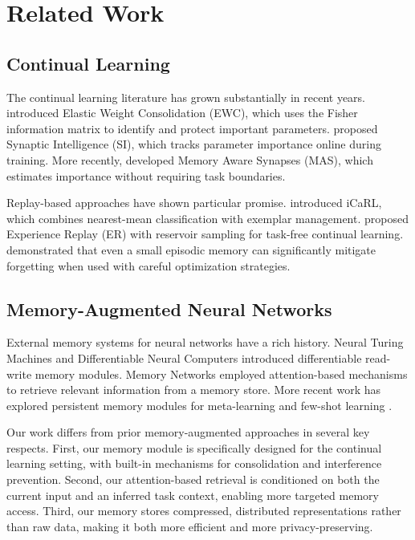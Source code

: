 \documentclass[11pt]{article}
\begin{document}
\section{Related Work}
\label{sec:related}

\subsection{Continual Learning}

The continual learning literature has grown substantially in recent years. \citet{kirkpatrick2017overcoming} introduced Elastic Weight Consolidation (EWC), which uses the Fisher information matrix to identify and protect important parameters. \citet{zenke2017continual} proposed Synaptic Intelligence (SI), which tracks parameter importance online during training. More recently, \citet{aljundi2018memory} developed Memory Aware Synapses (MAS), which estimates importance without requiring task boundaries.

Replay-based approaches have shown particular promise. \citet{rebuffi2017icarl} introduced iCaRL, which combines nearest-mean classification with exemplar management. \citet{rolnick2019experience} proposed Experience Replay (ER) with reservoir sampling for task-free continual learning. \citet{chaudhry2019tiny} demonstrated that even a small episodic memory can significantly mitigate forgetting when used with careful optimization strategies.

\subsection{Memory-Augmented Neural Networks}

External memory systems for neural networks have a rich history. Neural Turing Machines \citep{graves2014neural} and Differentiable Neural Computers \citep{graves2016hybrid} introduced differentiable read-write memory modules. Memory Networks \citep{weston2014memory, sukhbaatar2015end} employed attention-based mechanisms to retrieve relevant information from a memory store. More recent work has explored persistent memory modules for meta-learning \citep{santoro2016meta, munkhdalai2017meta} and few-shot learning \citep{kaiser2017learning}.

Our work differs from prior memory-augmented approaches in several key respects. First, our memory module is specifically designed for the continual learning setting, with built-in mechanisms for consolidation and interference prevention. Second, our attention-based retrieval is conditioned on both the current input and an inferred task context, enabling more targeted memory access. Third, our memory stores compressed, distributed representations rather than raw data, making it both more efficient and more privacy-preserving.
\end{document}
